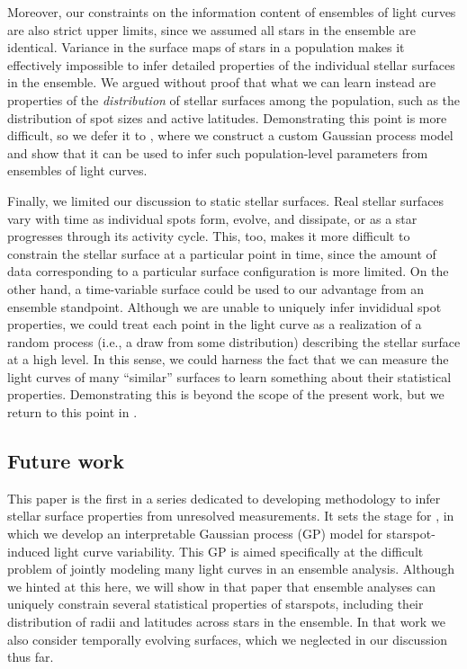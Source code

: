 \documentclass[modern,linenumbers]{aastex62}
\begin{document}
Moreover, our constraints on the information content of ensembles of light curves are
also strict upper limits, since we assumed all stars in the ensemble
are identical. Variance in the surface maps of stars in
a population makes it effectively impossible to infer detailed
properties of the individual stellar surfaces in the ensemble.
We argued without proof that what we can learn instead are properties of the
\emph{distribution} of stellar surfaces among the population, such as
the distribution of spot sizes and active latitudes.
Demonstrating this point is more difficult, so we defer it to
, where we construct a custom Gaussian process model
and show that it can be used to infer such population-level parameters
from ensembles of light curves.

Finally, we limited our discussion to static stellar surfaces.
Real stellar surfaces vary
with time as individual spots form, evolve, and dissipate, or as a star progresses
through its activity cycle. This, too, makes it more difficult to constrain
the stellar surface at a particular point in time, since the amount of
data corresponding to a particular surface configuration is more limited.
On the other hand, a time-variable surface could be used to our advantage
from an ensemble standpoint. Although we are unable to uniquely infer
invididual spot properties, we could treat each point in the light curve
as a realization of a random process (i.e., a draw from some distribution)
describing the stellar surface at a high level. In this sense, we could
harness the fact that we can measure the light curves of many ``similar''
surfaces to learn something about their statistical properties.
Demonstrating this is beyond the scope of the present work, but we
return to this point in .

\subsection{Future work}

This paper is the first in a series dedicated to developing
methodology to infer stellar surface properties from
unresolved measurements. It sets the stage for \citet{PaperII},
in which we develop an interpretable Gaussian process (GP) model for
starspot-induced light curve variability. This GP is aimed specifically
at the difficult problem of jointly modeling many light curves
in an ensemble analysis. Although we hinted at this here, we will show
in that paper that ensemble analyses can uniquely constrain several
statistical properties of starspots, including their distribution
of radii and latitudes across stars in the ensemble. In that work
we also consider temporally evolving surfaces, which we neglected
in our discussion thus far.
\end{document}
